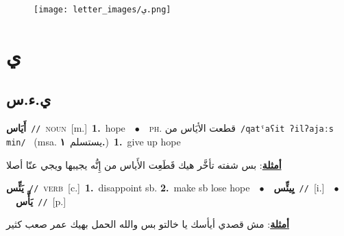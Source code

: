 \documentclass[10pt,a4paper,twoside]{article} %
\begin{document}
\begin{figure*}[t!]\centering\texttt{[image: letter\_images/ي.png]}\end{figure*}
\color{white}

 \section*{\foreignlanguage{arabic}{ي}} 
 \begin{multicols}{2} 

%
\color{black}
\vspace{-3mm}
\subsection*{\color{blue}\foreignlanguage{arabic}{ي.ء.س}\color{blue}{}} 

{\setlength\topsep{0pt}\textbf{\foreignlanguage{arabic}{أَيَاس}}\ {\color{gray}\texttt{//}\color{black}}\ \textsc{noun}\ [m.]\ \textbf{1.}~hope\ \ $\bullet$\ \ \textsc{ph.} \color{gray} \foreignlanguage{arabic}{قطعت الأيَاس من}\color{black}\ {\color{gray}\texttt{/{\sffamily qatˤaʕit ʔilʔajaːs min}/}\color{black}}\ \color{gray} (msa. \foreignlanguage{arabic}{يستسلم}~\foreignlanguage{arabic}{\textbf{١.}})\color{black}\ \textbf{1.}~give up hope\  \begin{flushright}\color{gray}\foreignlanguage{arabic}{\textbf{\underline{\foreignlanguage{arabic}{أمثلة}}}: بس شفته تأخَّر هيك قَطَعِت الأَياس من إِنُّه يجيبها ويجي عنّا أصلا}\end{flushright}\color{black}} \vspace{2mm}

{\setlength\topsep{0pt}\textbf{\foreignlanguage{arabic}{يَئِّس}}\ {\color{gray}\texttt{//}\color{black}}\ \textsc{verb}\ [c.]\ \textbf{1.}~disappoint sb.  \textbf{2.}~make sb lose hope\ \ $\bullet$\ \ \setlength\topsep{0pt}\textbf{\foreignlanguage{arabic}{يِيئِّس}}\ {\color{gray}\texttt{//}\color{black}}\ [i.]\ \ $\bullet$\ \ \setlength\topsep{0pt}\textbf{\foreignlanguage{arabic}{يَأَّس}}\ {\color{gray}\texttt{//}\color{black}}\ [p.]\  \begin{flushright}\color{gray}\foreignlanguage{arabic}{\textbf{\underline{\foreignlanguage{arabic}{أمثلة}}}: مش قصدي أيأسك يا خالتو بس والله الحمل بهيك عمر صعب كثير}\end{flushright}\color{black}} \vspace{2mm}


\end{multicols}
\end{document}
